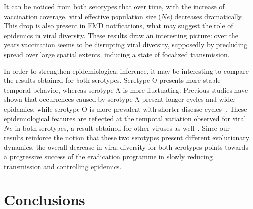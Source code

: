 \documentclass[10pt]{article}
\begin{document}
%

It can be noticed from both serotypes that over time, with the increase of vaccination coverage, viral effective population size ($Ne$) decreases dramatically.
This drop is also present in FMD notifications, what may suggest the role of epidemics in viral diversity.
These results draw an interesting picture: over the years vaccination seems to be disrupting viral diversity, supposedly by precluding spread over large spatial extents, inducing a state of focalized transmission.

In order to strengthen epidemiological inference, it may be interesting to compare the results obtained for both serotypes.
Serotype O presents more stable temporal behavior, whereas serotype A is more fluctuating.
Previous studies have shown that occurrences caused by serotype A present longer cycles and wider epidemics, while serotype O is more prevalent with shorter disease cycles~\cite{colombiatime}.
These epidemiological features are reflected at the temporal variation observed for viral $Ne$ in both serotypes, a result obtained for other viruses as well~\cite{Bennett2010,Pybus2003}. 
Since our results reinforce the notion that these two serotypes present different evolutionary dynamics, the overall decrease in viral diversity for both serotypes points towards a progressive success of the eradication programme in slowly reducing transmission and controlling epidemics.

\section*{Conclusions}
\end{document}
